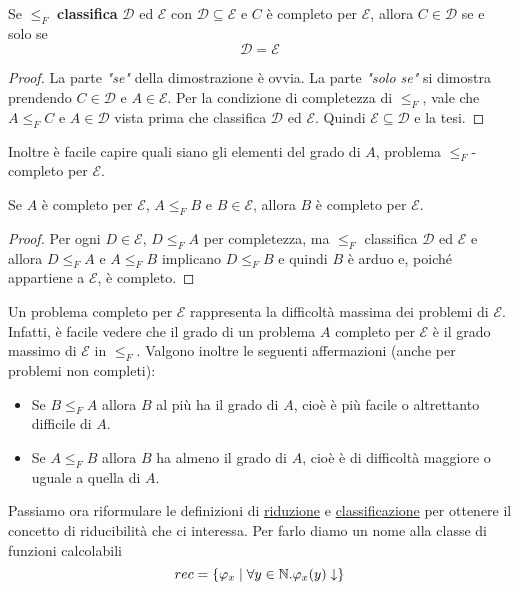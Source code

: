 \begin{property}
	Se $\leq_F$ \textbf{classifica} $\mathcal{D}$ ed $\mathcal{E}$
	con $\mathcal{D} \subseteq \mathcal{E}$ e $C$ è completo per
	$\mathcal{E}$, allora $C \in \mathcal{D}$ se e solo se
	\[ \mathcal{D} = \mathcal{E} \]
	\begin{proof}
		La parte \emph{"se"} della dimostrazione è ovvia. La
		parte \emph{"solo se"} si dimostra prendendo
		$C \in \mathcal{D}$ e $A \in \mathcal{E}$. Per
		la condizione di completezza di $\leq_F$, vale che
		$A \leq_F C$ e $A \in \mathcal{D}$ vista prima che
		classifica $\mathcal{D}$ ed $\mathcal{E}$. Quindi
		$\mathcal{E} \subseteq \mathcal{D}$ e la tesi.
	\end{proof}
\end{property}

Inoltre è facile capire quali siano gli elementi del grado di
$A$, problema $\leq_F$-completo per $\mathcal{E}$.

\begin{property}
	Se $A$ è completo per $\mathcal{E}$, $A \leq_F B$ e
	$B \in \mathcal{E}$, allora $B$ è completo per $\mathcal{E}$.
	\begin{proof}
		Per ogni $D \in \mathcal{E}$, $D \leq_F A$ per
		completezza, ma $\leq_F$ classifica $\mathcal{D}$ ed
		$\mathcal{E}$ e allora $D \leq_F A$ e $A \leq_F B$
		implicano $D \leq_F B$ e quindi $B$ è arduo e, poiché
		appartiene a $\mathcal{E}$, è completo.
	\end{proof}
\end{property}

Un problema completo per $\mathcal{E}$ rappresenta la difficoltà
massima dei problemi di $\mathcal{E}$. Infatti, è facile vedere
che il grado di un problema $A$ completo per $\mathcal{E}$ è il
grado massimo di $\mathcal{E}$ in  $\leq_F$. Valgono inoltre le
seguenti affermazioni (anche per problemi non completi):
\begin{itemize}
	\item Se $B \leq_F A$ allora $B$ al più ha il grado di $A$,
	      cioè è più facile o altrettanto difficile di $A$.
	\item Se $A \leq_F B$ allora $B$ ha almeno il grado di $A$,
	      cioè è di difficoltà maggiore o uguale a quella di $A$.
\end{itemize}
Passiamo ora riformulare le definizioni di
\hyperref[def: riduzione]{riduzione} e
\hyperref[def: classificazione]{classificazione} per ottenere
il concetto di riducibilità che ci interessa. Per farlo diamo
un nome alla classe di funzioni calcolabili
\[ rec = \{ \varphi_x \mid \forall y \in \mathbb{N} . \varphi_x(y) \downarrow \} \]

